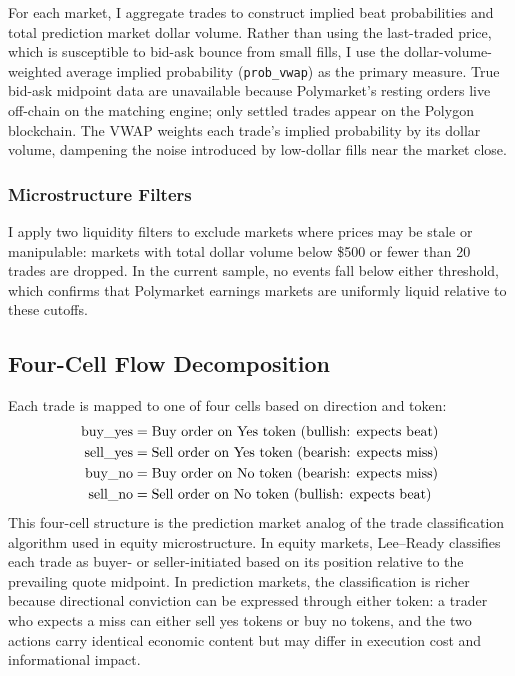 \documentclass[11pt]{article}
\begin{document}
For each market, I aggregate trades to construct implied beat probabilities and total prediction market dollar volume. Rather than using the last-traded price, which is susceptible to bid-ask bounce from small fills, I use the dollar-volume-weighted average implied probability (\texttt{prob\_vwap}) as the primary measure. True bid-ask midpoint data are unavailable because Polymarket's resting orders live off-chain on the matching engine; only settled trades appear on the Polygon blockchain. The VWAP weights each trade's implied probability by its dollar volume, dampening the noise introduced by low-dollar fills near the market close.

\subsubsection{Microstructure Filters}

I apply two liquidity filters to exclude markets where prices may be stale or manipulable: markets with total dollar volume below \$500 or fewer than 20 trades are dropped. In the current sample, no events fall below either threshold, which confirms that Polymarket earnings markets are uniformly liquid relative to these cutoffs.

\subsection{Four-Cell Flow Decomposition}

Each trade is mapped to one of four cells based on direction and token:
\begin{align}
\text{buy\_yes} &= \text{Buy order on Yes token (bullish: expects beat)} \notag \\
\text{sell\_yes} &= \text{Sell order on Yes token (bearish: expects miss)} \notag \\
\text{buy\_no} &= \text{Buy order on No token (bearish: expects miss)} \notag \\
\text{sell\_no} &= \text{Sell order on No token (bullish: expects beat)} \notag
\end{align}
This four-cell structure is the prediction market analog of the \citet{lee1991inferring} trade classification algorithm used in equity microstructure. In equity markets, Lee--Ready classifies each trade as buyer- or seller-initiated based on its position relative to the prevailing quote midpoint. In prediction markets, the classification is richer because directional conviction can be expressed through either token: a trader who expects a miss can either sell yes tokens or buy no tokens, and the two actions carry identical economic content but may differ in execution cost and informational impact.
\end{document}
